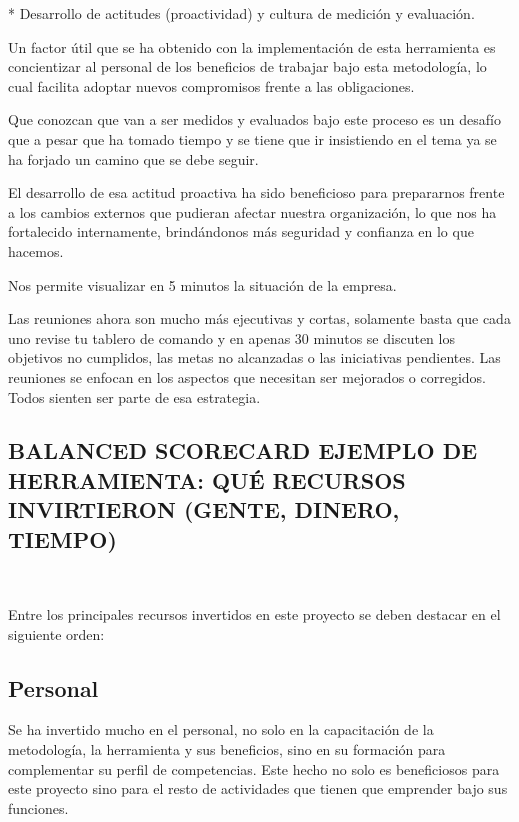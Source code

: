 {* Desarrollo de  actitudes (proactividad) y cultura de medición y evaluación.

Un factor útil que se ha obtenido con la implementación de esta herramienta es concientizar al personal de los beneficios de trabajar bajo esta metodología, lo cual facilita adoptar nuevos compromisos frente a las obligaciones.

Que conozcan que van a ser medidos y evaluados bajo este proceso es un desafío que a pesar que ha tomado tiempo y se tiene que ir insistiendo en el tema ya se ha forjado un camino que se debe seguir.

El desarrollo de esa actitud proactiva ha sido beneficioso para prepararnos frente a los cambios externos que pudieran afectar nuestra organización, lo que nos ha fortalecido internamente, brindándonos más seguridad y confianza en lo que hacemos.

Nos permite visualizar en 5 minutos la situación de la empresa.

Las reuniones ahora son mucho más ejecutivas y cortas, solamente basta que cada uno revise tu tablero de comando y en apenas 30 minutos se discuten los objetivos no cumplidos, las metas no alcanzadas o las iniciativas pendientes. Las reuniones se enfocan en los aspectos que necesitan ser mejorados o corregidos. Todos sienten ser parte de esa estrategia.
}


\begin{center}
\vspace*{0.1in}
\begin{Large}
\section{BALANCED SCORECARD EJEMPLO DE HERRAMIENTA: QUÉ RECURSOS INVIRTIERON (GENTE, DINERO, TIEMPO)} \\
\end{Large}
\end{center}

\item {Entre los principales recursos invertidos en este proyecto se deben destacar en el siguiente orden:}


\subsection{Personal}
\item {Se ha invertido mucho en el personal, no solo en la capacitación de la metodología, la herramienta y sus beneficios, sino en su formación para complementar su perfil de competencias. Este hecho no solo es beneficiosos para este proyecto sino para el resto de actividades que tienen que emprender bajo sus funciones.}

